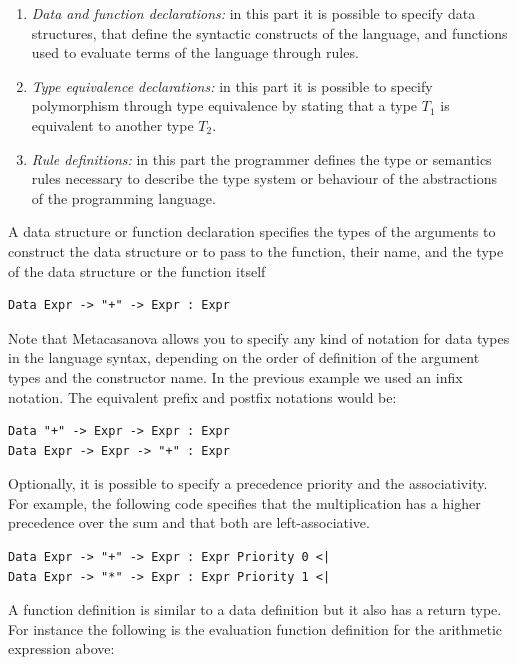 \begin{enumerate}
	\item \textit{Data and function declarations:} in this part it is possible to specify data structures, that define the syntactic constructs of the language, and functions used to evaluate terms of the language through rules.
	\item \textit{Type equivalence declarations:} in this part it is possible to specify polymorphism through type equivalence by stating that a type $T_1$ is equivalent to another type $T_2$.
	\item \textit{Rule definitions:} in this part the programmer defines the type or semantics rules necessary to describe the type system or behaviour of the abstractions of the programming language.
\end{enumerate}

A data structure or function declaration specifies the types of the arguments to construct the data structure or to pass to the function, their name, and the type of the data structure or the function itself
\begin{lstlisting}
Data Expr -> "+" -> Expr : Expr
\end{lstlisting}

\noindent
Note that Metacasanova allows you to specify any kind of notation for data types in the language syntax, depending on the order of definition of the argument types and the constructor name. In the previous example we used an infix notation. The equivalent prefix and postfix notations would be:

\begin{lstlisting}
Data "+" -> Expr -> Expr : Expr
Data Expr -> Expr -> "+" : Expr
\end{lstlisting}

Optionally, it is possible to specify a precedence priority and the associativity. For example, the following code specifies that the multiplication has a higher precedence over the sum and that both are left-associative.

\begin{lstlisting}
Data Expr -> "+" -> Expr : Expr Priority 0 <|
Data Expr -> "*" -> Expr : Expr Priority 1 <|
\end{lstlisting}

\noindent
A function definition is similar to a data definition but it also has a return type. For instance the following is the evaluation function definition for the arithmetic expression above:

